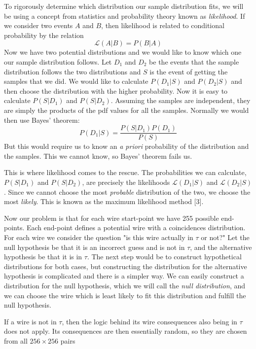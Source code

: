 \documentclass[12pt]{article}
\theoremstyle{definition}
\theoremstyle{remark}
\theoremstyle{remark}
\begin{document}
\par
To rigorously determine which distribution our sample distribution fits, we will be using a concept from statistics and probability theory known as \emph{likelihood}. If we consider two events $A$ and $B$, then likelihood is related to conditional probability by the relation 
\[ \mathcal{L}(A|B)=P(B|A)\]
Now we have two potential distributions and we would like to know which one our sample distribution follows. Let $D_1$ and $D_2$ be the events that the sample distribution follows the two distributions and $S$ is the event of getting the samples that we did. We would like to calculate $P( D_1 |S)$ and $P( D_2 | S)$ and then choose the distribution with the higher probability. Now it is easy to calculate $P(S | D_1 )$ and $P(S | D_2 )$. Assuming the samples are independent, they are simply the products of the pdf values for all the samples. Normally we would then use Bayes' theorem:
\[ P(D_1 | S) = \frac{P(S | D_1) P(D_1)}{P(S)} \]
But this would require us to know an \emph{a priori} probability of the distribution and the samples. This we cannot know, so Bayes' theorem fails us. 

\par
This is where likelihood comes to the rescue. The probabilities we can calculate, $P( S | D_1)$ and $P( S | D_2 )$, are precisely the likelihoods $\mathcal{L}(D_1 | S)$ and $\mathcal{L}(D_2 | S)$. Since we cannot choose the most \emph{probable} distribution of the two, we choose the most \emph{likely}. This is known as the maximum likelihood method [3].


\par
Now our problem is that for each wire start-point we have 255 possible end-points. Each end-point defines a potential wire with a coincidences distribution. For each wire we consider the question "is this wire actually in $\tau$ or not?" Let the null hypothesis be that it is an incorrect guess and is not in $\tau$, and the alternative hypothesis be that it is in $\tau$. The next step would be to construct hypothetical distributions for both cases, but constructing the distribution for the alternative hypothesis is complicated and there is a simpler way. We can easily construct a distribution for the null hypothesis, which we will call the \emph{null distribution}, and we can choose the wire which is least likely to fit this distribution and fulfill the null hypothesis.

\par
If a wire is not in $\tau$, then the logic behind its wire consequences also being in $\tau$ does not apply. Its consequences are then essentially random, so they are chosen from all $256\times 256$ pairs
\end{document}
